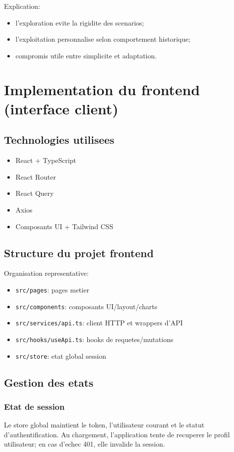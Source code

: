 \documentclass[12pt,a4paper,oneside]{report}
\begin{document}
Explication:
\begin{itemize}[leftmargin=1.2cm]
  \item l'exploration evite la rigidite des scenarios;
  \item l'exploitation personnalise selon comportement historique;
  \item compromis utile entre simplicite et adaptation.
\end{itemize}

\chapter{Implementation du frontend (interface client)}

\section{Technologies utilisees}
\begin{itemize}[leftmargin=1.2cm]
  \item React + TypeScript
  \item React Router
  \item React Query
  \item Axios
  \item Composants UI + Tailwind CSS
\end{itemize}

\section{Structure du projet frontend}
Organisation representative:
\begin{itemize}[leftmargin=1.2cm]
  \item \texttt{src/pages}: pages metier
  \item \texttt{src/components}: composants UI/layout/charts
  \item \texttt{src/services/api.ts}: client HTTP et wrappers d'API
  \item \texttt{src/hooks/useApi.ts}: hooks de requetes/mutations
  \item \texttt{src/store}: etat global session
\end{itemize}

\section{Gestion des etats}
\subsection{Etat de session}
Le store global maintient le token, l'utilisateur courant et le statut d'authentification. Au chargement, l'application tente de recuperer le profil utilisateur; en cas d'echec 401, elle invalide la session.
\end{document}
